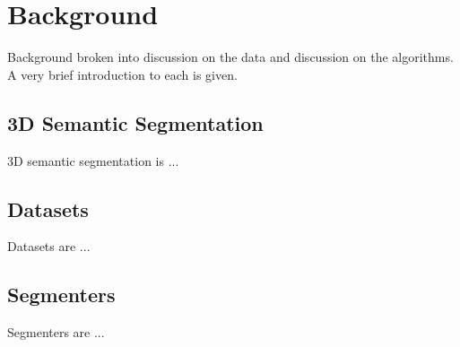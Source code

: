 \section{Background}
\label{chap:background}

Background broken into discussion on the data and discussion on the algorithms. A very brief introduction to each is given.

\subsection{3D Semantic Segmentation}
\label{chap:3d-semantic-segmentation}

3D semantic segmentation is ...

\subsection{Datasets}
\label{chap:datasets}

Datasets are ...

\subsection{Segmenters}
\label{chap:segmenters}

Segmenters are ...

